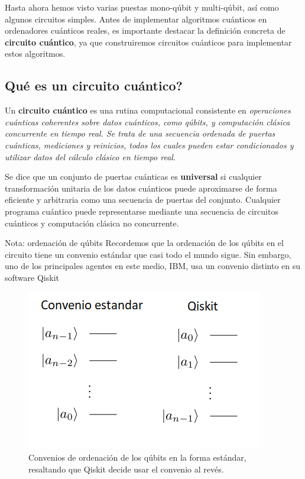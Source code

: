 \documentclass[a4paper,11pt]{book} %
\numberwithin{equation}{chapter}
\begin{document}
Hasta ahora hemos visto varias puestas mono-qúbit y multi-qúbit, así como algunos circuitos simples. 
Antes de implementar algoritmos cuánticos en ordenadores cuánticos reales, es importante destacar la definición concreta de \textbf{circuito cuántico}, ya que construiremos circuitos cuánticos para implementar estos algoritmos.

		\subsection{Qué es un circuito cuántico?}
		
Un \textbf{circuito cuántico} es una rutina computacional consistente en \textit{operaciones cuánticas coherentes sobre datos cuánticos, como qúbits, y computación clásica concurrente en tiempo real. Se trata de una secuencia ordenada de puertas cuánticas, mediciones y reinicios, todos los cuales pueden estar condicionados y utilizar datos del cálculo clásico en tiempo real.}

Se dice que un conjunto de puertas cuánticas es \textbf{universal} si cualquier transformación unitaria de los datos cuánticos puede aproximarse de forma eficiente y arbitraria como una secuencia de puertas del conjunto. Cualquier programa cuántico puede representarse mediante una secuencia de circuitos cuánticos y computación clásica no concurrente.

	\begin{mybox_blue}{Nota: ordenación de qúbits}
	Recordemos que la ordenación de los qúbits en el circuito tiene un convenio estándar que casi todo el mundo sigue. Sin embargo,
	uno de los principales agentes en este medio, IBM, usa un convenio distinto en su software Qiskit
	\begin{figure}[H]
	\centering 
	\includegraphics[width=0.4\linewidth]{Figuras/Fig_multiqubits_convenios_ordenacion.png}
	\caption{Convenios de ordenación de los qúbits en la forma estándar, resaltando que Qiskit decide usar el convenio al revés.}
	\label{Fig_elementos_convenios_ordenacion}
	\end{figure}
	\end{mybox_blue}
	
\end{document}
